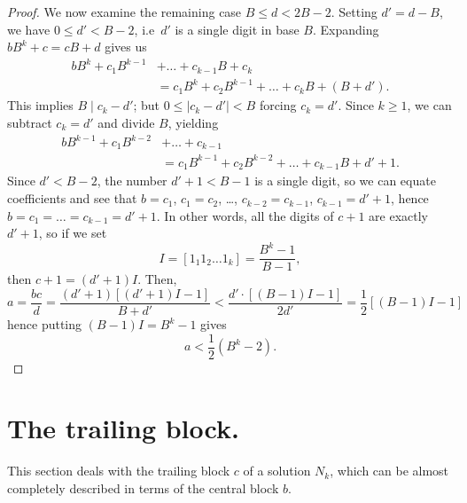 \documentclass[sn-mathphys]{sn-jnl}%
\theoremstyle{thmstyleone}%
\theoremstyle{thmstyletwo}%
\theoremstyle{thmstylethree}%
\begin{document}
\begin{appendices}
\begin{proof}
    We now examine the remaining case $B \leq d < 2B - 2$. Setting $d' = d - B$, we have
    $0 \leq d' < B - 2$, i.e\ $d'$ is a single digit in base $B$. Expanding $bB^k + c = cB + d$
    gives us \begin{align*}
        bB^k + c_1B^{k - 1} &+ \dots + c_{k - 1}B + c_k \\
        &= c_1B^k + c_2B^{k - 1} + \dots + c_kB + (B + d').
    \end{align*}
    This implies $B \mid c_k - d'$; but $0 \leq \vert c_k - d'\vert < B$ forcing 
    $c_k = d'$. Since $k \geq 1$, we can subtract $c_k = d'$ and divide $B$, yielding
    \begin{align*}
        bB^{k - 1} + c_1B^{k - 2} &+ \dots + c_{k - 1} \\
        &= c_1B^{k - 1} + c_2B^{k - 2} + \dots + c_{k - 1}B + d' + 1. \tag{$\star$}
    \end{align*}
    Since $d' < B - 2$, the number $d' + 1 < B - 1$ is a single digit, so we 
    can equate coefficients and see that $b = c_1$, $c_1 = c_2$, \dots, 
    $c_{k - 2} = c_{k - 1}$, $c_{k - 1} = d' + 1$, hence $b = c_1 = \dots = c_{k - 1} = 
    d' + 1$. In other words, all the digits of $c + 1$ are exactly $d' + 1$, 
    so if we set \[
        I = [1_1 1_2\dots 1_k] = \frac{B^k - 1}{B - 1},
    \] then $c + 1 = (d' + 1)I$. Then, \[
        a = \frac{bc}{d} = \frac{(d' + 1)[(d' + 1)I - 1]}{B + d'} 
        < \frac{d'\cdot [(B - 1)I - 1]}{2d'} = 
        \frac{1}{2}[(B - 1)I - 1]
    \] hence putting $(B - 1)I = B^k - 1$ gives \[
        a < \frac{1}{2}(B^k - 2). %
    \]
\end{proof}


\section{The trailing block.}

This section deals with the trailing block $c$ of a solution $N_k$, which
can be almost completely described in terms of the central block $b$.


\end{appendices}
\end{document}
